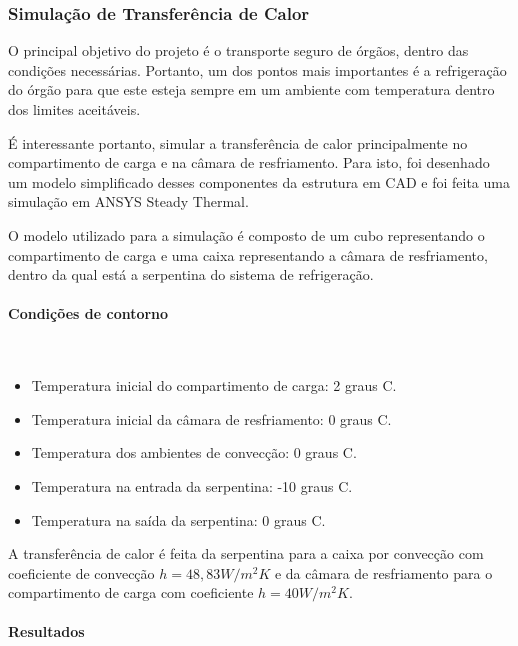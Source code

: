 \subsubsection{Simulação de Transferência de Calor }

O principal objetivo do projeto é o transporte seguro de órgãos, dentro das condições necessárias. Portanto, um dos pontos mais importantes é a refrigeração do órgão para que este esteja sempre em um ambiente com temperatura dentro dos limites aceitáveis.

É interessante portanto, simular a transferência de calor principalmente no compartimento de carga e na câmara de resfriamento. Para isto, foi desenhado um modelo simplificado desses componentes da estrutura em CAD e foi feita uma simulação em ANSYS Steady Thermal.

O modelo utilizado para a simulação é composto de um cubo representando o compartimento de carga e uma caixa representando a câmara de resfriamento, dentro da qual está a serpentina do sistema de refrigeração.

\paragraph*{Condições de contorno}\

\begin{itemize}
\item Temperatura inicial do compartimento de carga: 2 graus C.
\item Temperatura inicial da câmara de resfriamento: 0 graus C.
\item Temperatura dos ambientes de convecção: 0 graus C.
\item Temperatura na entrada da serpentina: -10 graus C.
\item Temperatura na saída da serpentina: 0 graus C.
\end{itemize}

A transferência de calor é feita da serpentina para a caixa por convecção com coeficiente de convecção $h = 48,83 W/m^2K$ e da câmara de resfriamento para o compartimento de carga com coeficiente $h = 40 W/m^2K$.

\paragraph*{Resultados}\

